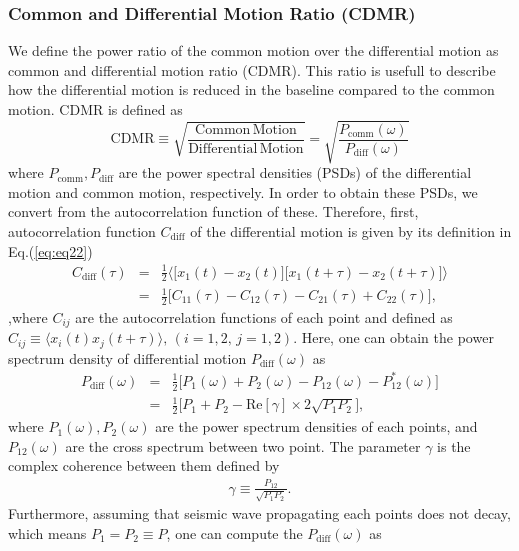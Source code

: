 \subsubsection{Common and Differential Motion Ratio (CDMR)}
We define the power ratio of the common motion over the differential motion as common and differential motion ratio (CDMR). This ratio is usefull to describe how the differential motion is reduced in the baseline compared to the common motion. CDMR is defined as
\begin{equation}
  \mathrm{CDMR} \equiv \sqrt{\frac{\mathrm{Common\,Motion}}{\mathrm{Differential\,Motion}}} = \sqrt{\frac{P_{\mathrm{comm}}(\omega)}{P_{\mathrm{diff}}(\omega)}} \label{eq:eq23}
\end{equation}
where $P_{\mathrm{comm}},P_{\mathrm{diff}}$ are the power spectral densities (PSDs) of the differential motion and common motion, respectively. In order to obtain these PSDs, we convert from the autocorrelation function of these. Therefore, first, autocorrelation function $C_{\mathrm{diff}}$ of the differential motion is given by its definition in Eq.(\ref{eq:eq22})
\begin{eqnarray}
  C_{\mathrm{diff}}(\tau) &=& \frac{1}{2}
  \biggl\langle
  \biggl[ x_{1}(t)-x_{2}(t) \biggr] \biggl[ x_{1}(t+\tau)-x_{2}(t+\tau) \biggr]
  \biggr\rangle \\
  &=& \frac{1}{2}\biggl[ C_{11}(\tau) - C_{12}(\tau) - C_{21}(\tau) + C_{22}(\tau) \biggr], 
\end{eqnarray}
,where $C_{ij}$ are the autocorrelation functions of each point and defined as $ C_{ij} \equiv \langle x_{i}(t)x_{j}(t+\tau)\rangle,\, (i=1,2,\,j=1,2)$. Here, one can obtain the power spectrum density of differential motion $P_{\mathrm{diff}}(\omega)$ as 
\begin{eqnarray}
  P_{\mathrm{diff}}(\omega) &=& \frac{1}{2}\biggl[ P_{1}(\omega) + P_{2}(\omega) - P_{12}(\omega) - P_{12}^*(\omega) \biggr]\\
  &=& \frac{1}{2} \biggl[ P_{1}+P_{2} - \mathrm{Re}\left[\gamma \right]\times2\sqrt{P_{1}P_{2}} \biggr], \label{eq:eq31}
\end{eqnarray}
where $P_{1}(\omega),P_{2}(\omega)$ are the power spectrum densities of each points, and $P_{12}(\omega)$ are the cross spectrum between two point. The parameter $\gamma$ is the complex coherence between them defined by
\begin{eqnarray}
  \gamma \equiv \frac{P_{12}}{\sqrt{P_{1}P_{2}}}.
\end{eqnarray}
Furthermore, assuming that seismic wave propagating each points does not decay, which means $P_{1}=P_{2} \equiv P$, one can compute the $P_{\mathrm{diff}}(\omega)$ as 
